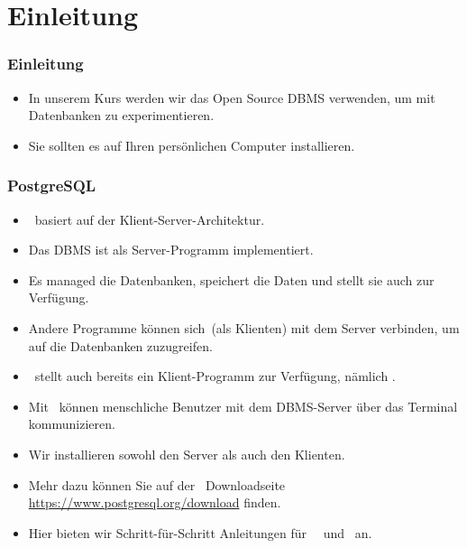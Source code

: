 \documentclass[aspectratio=169,mathserif,notheorems]{beamer}%
\subtitle{6.~PostgreSQL Installieren}%
\begin{document}
%
%
\startPresentation%
%
\section{Einleitung}%
%
\begin{frame}%
\frametitle{Einleitung}%
\begin{itemize}%
\item In unserem Kurs werden wir das Open Source DBMS \postgresql\cite{TA2024DDAMWPAM,FP2023LP,OH2017PUAR,B2024PELUYDW} verwenden, um mit Datenbanken zu experimentieren.%
\item<2-> Sie sollten es auf Ihren persönlichen Computer installieren.%
\end{itemize}%
%
\end{frame}%
%
\begin{frame}
\frametitle{PostgreSQL}%
\begin{itemize}%
\item \postgresql\ basiert auf der Klient-Server-Architektur.%
\item<2-> Das DBMS ist als Server-Programm implementiert.%
\item<3-> Es managed die Datenbanken, speichert die Daten und stellt sie auch zur Verfügung.%
\item<4-> Andere Programme können sich~(als Klienten) mit dem Server verbinden, um auf die Datenbanken zuzugreifen.%
\item<5-> \postgresql\ stellt auch bereits ein Klient-Programm zur Verfügung, nämlich \psql.%
\item<6-> Mit \sql\ können  menschliche Benutzer mit dem DBMS-Server über das Terminal kommunizieren.%
\item<7-> Wir installieren sowohl den Server als auch den Klienten.%
\item<8-> Mehr dazu können Sie auf der \postgresql\ Downloadseite \url{https://www.postgresql.org/download} finden.%
\item<9-> Hier bieten wir Schritt-für-Schritt Anleitungen für \ubuntu\ \linux\ und \microsoftWindows\ an.%
\end{itemize}%
\end{frame}%
%
\end{document}
